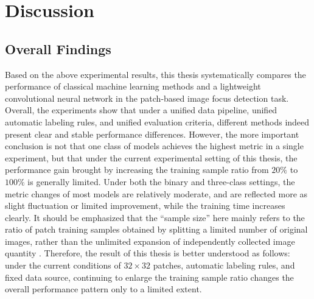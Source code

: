 \section{Discussion}
\subsection{Overall Findings}
\par Based on the above experimental results, this thesis systematically
compares the performance of classical machine learning methods and a lightweight
convolutional neural network in the patch-based image focus detection task.
Overall, the experiments show that under a unified data pipeline, unified
automatic labeling rules, and unified evaluation criteria, different methods
indeed present clear and stable performance differences. However, the more
important conclusion is not that one class of models achieves the highest metric
in a single experiment, but that under the current experimental setting of this
thesis, the performance gain brought by increasing the training sample ratio
from $20\%$ to $100\%$ is generally limited. Under both the binary and
three-class settings, the metric changes of most models are relatively moderate,
and are reflected more as slight fluctuation or limited improvement, while the
training time increases clearly. It should be emphasized that the ``sample
size'' here mainly refers to the ratio of patch training samples obtained by
splitting a limited number of original images, rather than the unlimited
expansion of independently collected image quantity
\cite{goodfellow2016deep,shu2018small}. Therefore, the result of this thesis is
better understood as follows: under the current conditions of
$32\times32$ patches, automatic labeling rules, and fixed data source,
continuing to enlarge the training sample ratio changes the overall performance
pattern only to a limited extent.

